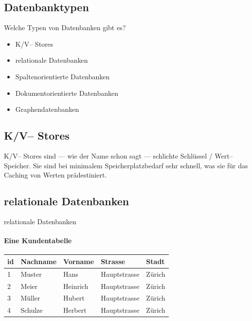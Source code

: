 
\subsection{Datenbanktypen}
\begin{frame}[<+->]{Welche Typen von Datenbanken gibt es?}
  \begin{itemize}
    \pause
    \item K/V-- Stores
    \item relationale Datenbanken
    \item Spaltenorientierte Datenbanken
    \item Dokumentorientierte Datenbanken
    \item Graphendatenbanken
  \end{itemize}
\end{frame}

\subsection*{K/V-- Stores}

\begin{frame}{}
  K/V-- Stores sind --- wie der Name schon sagt --- schlichte Schlüssel / Wert-- Speicher. Sie sind bei minimalem Speicherplatzbedarf sehr schnell, was sie für das Caching von Werten prädestiniert.
\end{frame}

\subsection*{relationale Datenbanken}
      
\begin{frame}{relationale Datenbanken}
\framesubtitle{Eine Kundentabelle}
  \begin{center}
    \begin{tabular}{lllll}
      id & Nachname & Vorname & Strasse & Stadt\\
      \hline
      1 & Muster & Hans & Hauptstrasse & Zürich\\
      2 & Meier & Heinrich & Hauptstrasse & Zürich\\
      3 & Müller & Hubert & Hauptstrasse & Zürich\\
      4 & Schulze & Herbert & Hauptstrasse & Zürich\\
    \end{tabular}
  \end{center}
\end{frame}

